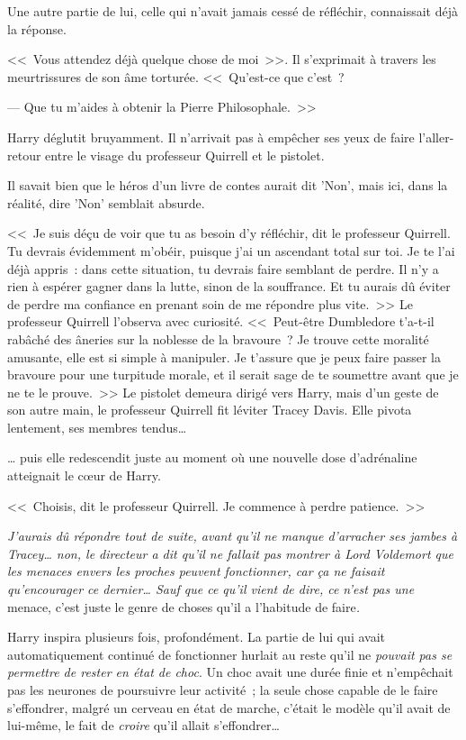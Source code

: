 Une autre partie de lui, celle qui n'avait jamais cessé de réfléchir, connaissait déjà la réponse.

<<~Vous attendez déjà quelque chose de moi~>>. Il s'exprimait à travers les meurtrissures de son âme torturée. <<~Qu'est-ce que c'est~?

--- Que tu m'aides à obtenir la Pierre Philosophale.~>>

Harry déglutit bruyamment. Il n'arrivait pas à empêcher ses yeux de faire l'aller-retour entre le visage du professeur Quirrell et le pistolet.

Il savait bien que le héros d'un livre de contes aurait dit 'Non', mais ici, dans la réalité, dire 'Non' semblait absurde.

<<~Je suis déçu de voir que tu as besoin d'y réfléchir, dit le professeur Quirrell. Tu devrais évidemment m'obéir, puisque j'ai un ascendant total sur toi. Je te l'ai déjà appris~: dans cette situation, tu devrais faire semblant de perdre. Il n'y a rien à espérer gagner dans la lutte, sinon de la souffrance. Et tu aurais dû éviter de perdre ma confiance en prenant soin de me répondre plus vite.~>> Le professeur Quirrell l'observa avec curiosité. <<~Peut-être Dumbledore t'a-t-il rabâché des âneries sur la noblesse de la bravoure~? Je trouve cette moralité amusante, elle est si simple à manipuler. Je t'assure que je peux faire passer la bravoure pour une turpitude morale, et il serait sage de te soumettre avant que je ne te le prouve.~>> Le pistolet demeura dirigé vers Harry, mais d'un geste de son autre main, le professeur Quirrell fit léviter Tracey Davis. Elle pivota lentement, ses membres tendus…

… puis elle redescendit juste au moment où une nouvelle dose d'adrénaline atteignait le cœur de Harry.

<<~Choisis, dit le professeur Quirrell. Je commence à perdre patience.~>>

\emph{J'aurais dû répondre tout de suite, avant qu'il ne manque d'arracher ses jambes à Tracey… non, le directeur a dit qu'il ne fallait pas montrer à Lord Voldemort que les menaces envers les proches peuvent fonctionner, car ça ne faisait qu'encourager ce dernier… Sauf que ce qu'il vient de dire, ce n'est pas une} menace, c'est juste le genre de choses qu'il a l'habitude de faire\emph{.}

Harry inspira plusieurs fois, profondément. La partie de lui qui avait automatiquement continué de fonctionner hurlait au reste qu'il ne \emph{pouvait pas se permettre de rester en état de choc}. Un choc avait une durée finie et n'empêchait pas les neurones de poursuivre leur activité~; la seule chose capable de le faire s'effondrer, malgré un cerveau en état de marche, c'était le modèle qu'il avait de lui-même, le fait de \emph{croire} qu'il allait s'effondrer…

